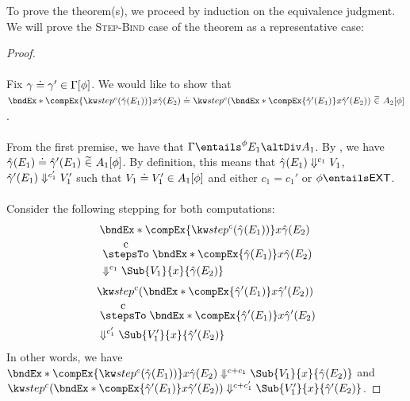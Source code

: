 \documentclass[letterpaper]{article}
\newcommand{\EXT}{\textsf{EXT}}
\newcommand{\gyat}{\hat{\gamma}}
\begin{document}
To prove the theorem(s), we proceed by induction on the equivalence judgment. We will prove the \textsc{Step-Bind} case of the theorem as a representative case:
\begin{proof}\phantom{nextline}\\\\
    Fix $\gamma\mathrel{\doteq}\gamma' \in \Gamma [\phi]$.
    We would like to show that\\ $\compEqOfPhase{\bndEx*{\compEx{\stepEx{c}{\gyat(E_1)}}}{x}{\gyat(E_2)}}{\stepEx{c}{\bndEx*{\compEx{\gyat'(E_1)}}{x}{\gyat'(E_2)}}}{A_2}{\phi}$.\\\\
    From the first premise, we have that $\Gamma \entailsPhase{\phi} E_1 \altDiv A_1$. By ,
    we have $\compEqOfPhase{\gyat(E_1)}{\gyat'(E_1)}{A_1}{\phi}$. By definition, this means that $\gyat(E_1) \evalsToC{c_1} V_1$, $\gyat'(E_1) \evalsToC{c_1'} V_1'$ such that $V_1\mathrel{\doteq}V_1' \in A_1 [\phi]$
    and either $c_1 = c_1'$ or $\phi \entails \EXT$.\\\\
    Consider the following stepping for both computations:
    \begin{align*}
        &\bndEx*{\compEx{\stepEx{c}{\gyat(E_1)}}}{x}{\gyat(E_2)}\\
        &\stepsToC{c} \bndEx*{\compEx{\gyat(E_1)}}{x}{\gyat(E_2)}\\
        &\evalsToC{c_1} \Sub{V_1}{x}{\gyat(E_2)}
    \end{align*}
    \begin{align*}
        &\stepEx{c}{\bndEx*{\compEx{\gyat'(E_1)}}{x}{\gyat'(E_2)}}\\
        &\stepsToC{c} \bndEx*{\compEx{\gyat'(E_1)}}{x}{\gyat'(E_2)}\\
        &\evalsToC{c_1'} \Sub{V_1'}{x}{\gyat'(E_2)}
    \end{align*}
    In other words, we have $\bndEx*{\compEx{\stepEx{c}{\gyat(E_1)}}}{x}{\gyat(E_2)} \evalsToC{c+c_1} \Sub{V_1}{x}{\gyat(E_2)}$ and $\stepEx{c}{\bndEx*{\compEx{\gyat'(E_1)}}{x}{\gyat'(E_2)}} \evalsToC{c+c_1'} \Sub{V_1'}{x}{\gyat'(E_2)}$.


\end{proof}
\end{document}
